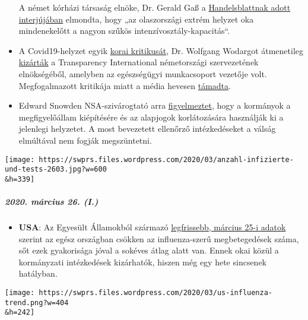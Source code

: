 \begin{itemize}
  A német kórházi társaság elnöke, Dr. Gerald Gaß a
  \href{https://www.handelsblatt.com/politik/deutschland/coronakrise-deutsche-krankenhausgesellschaft-wir-sind-besser-vorbereitet-als-italien/25651268.html}{Handelsblattnak
  adott interjújában} elmondta, hogy „az olaszországi extrém helyzet oka
  mindenekelőtt a nagyon szűkös intenzívosztály-kapacitás``.
\item
  A Covid19-helyzet egyik
  \href{https://www.youtube.com/watch?v=p_AyuhbnPOI}{korai kritikusát},
  Dr. Wolfgang Wodargot átmenetileg
  \href{https://www.transparency.de/aktuelles/detail/article/in-eigener-sache-vorstand-beschliesst-ruhen-der-mitgliedschaft-von-wolfgang-wodarg-1/}{kizárták}
  a Transparency International németországi szervezetének elnökségéből,
  amelyben az egészségügyi munkacsoport vezetője volt. Megfogalmazott
  kritikája miatt a média hevesen
  \href{https://www.youtube.com/watch?v=xcirqmhBCvk}{támadta}.
\item
  Edward Snowden NSA-szivárogtató arra
  \href{https://www.futurezone.de/digital-life/article228779795/Gefaehrliche-weltweite-Entwicklung-Edward-Snowden-warnt-vor-Ueberwachung.html}{figyelmeztet},
  hogy a kormányok a megfigyelőállam kiépítésére és az alapjogok
  korlátozására használják ki a jelenlegi helyzetet. A most bevezetett
  ellenőrző intézkedéseket a válság elmúltával nem fogják megszüntetni.
\end{itemize}

\texttt{[image: https://swprs.files.wordpress.com/2020/03/anzahl-infizierte-und-tests-2603.jpg?w=600\\\&h=339]}

\hypertarget{2020-muxe1rcius-26-i}{%
\subparagraph{\texorpdfstring{\textbf{2020. március 26.
(I.)}}{2020. március 26. (I.)}}\label{2020-muxe1rcius-26-i}}

\begin{itemize}
\tightlist
\item
  \textbf{USA}: Az Egyesült Államokból származó
  \href{https://healthweather.us/}{legfrissebb, március 25-i adatok}
  szerint az egész országban csökken az influenza-szerű megbetegedések
  száma, sőt ezek gyakorisága jóval a sokéves átlag alatt van. Ennek
  okai közül a kormányzati intézkedések kizárhatók, hiszen még egy hete
  sincsenek hatályban.
\end{itemize}

\href{https://swprs.org/covid-19-hinweis-ii/us-influenza-trend/}{}

\texttt{[image: https://swprs.files.wordpress.com/2020/03/us-influenza-trend.png?w=404\\\&h=242]}

